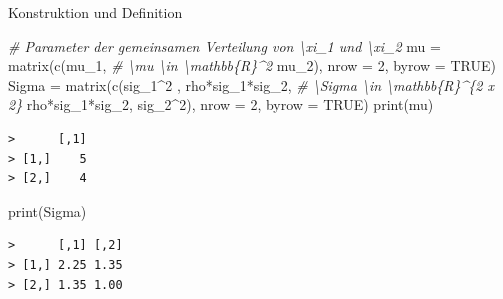\documentclass[
  8pt,
  ignorenonframetext,
]{beamer}
\newenvironment{Shaded}{\begin{snugshade}}{\end{snugshade}}
\newcommand{\AttributeTok}[1]{\textcolor[rgb]{0.77,0.63,0.00}{#1}}
\newcommand{\CommentTok}[1]{\textcolor[rgb]{0.56,0.35,0.01}{\textit{#1}}}
\newcommand{\ConstantTok}[1]{\textcolor[rgb]{0.00,0.00,0.00}{#1}}
\newcommand{\DecValTok}[1]{\textcolor[rgb]{0.00,0.00,0.81}{#1}}
\newcommand{\FunctionTok}[1]{\textcolor[rgb]{0.00,0.00,0.00}{#1}}
\newcommand{\NormalTok}[1]{#1}
\newcommand{\OtherTok}[1]{\textcolor[rgb]{0.56,0.35,0.01}{#1}}
\newcommand{\SpecialCharTok}[1]{\textcolor[rgb]{0.00,0.00,0.00}{#1}}
\begin{document}
\begin{frame}[fragile]{Konstruktion und Definition}
\begin{Shaded}
\begin{Highlighting}[]
\CommentTok{\# Parameter der gemeinsamen Verteilung von \textbackslash{}xi\_1 und \textbackslash{}xi\_2}
\NormalTok{mu     }\OtherTok{=} \FunctionTok{matrix}\NormalTok{(}\FunctionTok{c}\NormalTok{(mu\_1,                                   }\CommentTok{\# \textbackslash{}mu \textbackslash{}in \textbackslash{}mathbb\{R\}\^{}2}
\NormalTok{                  mu\_2),  }
                 \AttributeTok{nrow =} \DecValTok{2}\NormalTok{, }\AttributeTok{byrow =} \ConstantTok{TRUE}\NormalTok{)}
\NormalTok{Sigma  }\OtherTok{=} \FunctionTok{matrix}\NormalTok{(}\FunctionTok{c}\NormalTok{(sig\_1}\SpecialCharTok{\^{}}\DecValTok{2}\NormalTok{        , rho}\SpecialCharTok{*}\NormalTok{sig\_1}\SpecialCharTok{*}\NormalTok{sig\_2,       }\CommentTok{\# \textbackslash{}Sigma \textbackslash{}in \textbackslash{}mathbb\{R\}\^{}\{2 x 2\}}
\NormalTok{                 rho}\SpecialCharTok{*}\NormalTok{sig\_1}\SpecialCharTok{*}\NormalTok{sig\_2, sig\_2}\SpecialCharTok{\^{}}\DecValTok{2}\NormalTok{),  }
                 \AttributeTok{nrow =} \DecValTok{2}\NormalTok{, }\AttributeTok{byrow =} \ConstantTok{TRUE}\NormalTok{)}
\FunctionTok{print}\NormalTok{(mu)}
\end{Highlighting}
\end{Shaded}

\begin{verbatim}
>      [,1]
> [1,]    5
> [2,]    4
\end{verbatim}

\begin{Shaded}
\begin{Highlighting}[]
\FunctionTok{print}\NormalTok{(Sigma)}
\end{Highlighting}
\end{Shaded}

\begin{verbatim}
>      [,1] [,2]
> [1,] 2.25 1.35
> [2,] 1.35 1.00
\end{verbatim}
\end{frame}
\end{document}
